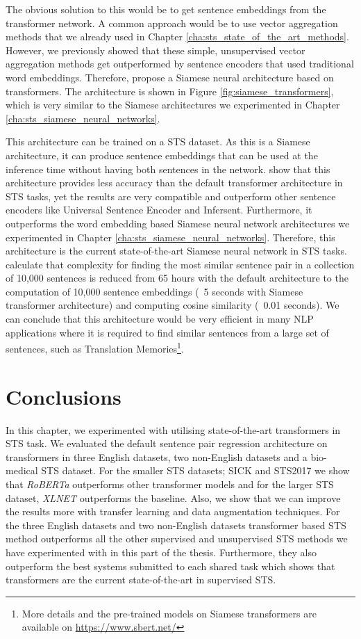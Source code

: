The obvious solution to this would be to get sentence embeddings from the transformer network. A common approach would be to use vector aggregation methods that we already used in Chapter \ref{cha:sts_state_of_the_art_methods}. However, we previously showed that these simple, unsupervised vector aggregation methods get outperformed by sentence encoders that used traditional word embeddings. Therefore, \autocite{reimers-gurevych-2019-sentence} propose a Siamese neural architecture based on transformers. The architecture is shown in Figure \ref{fig:siamese_transformers}, which is very similar to the Siamese architectures we experimented in Chapter \ref{cha:sts_siamese_neural_networks}.

This architecture can be trained on a STS dataset. As this is a Siamese architecture, it can produce sentence embeddings that can be used at the inference time without having both sentences in the network. \autocite{reimers-gurevych-2019-sentence} show that this architecture provides less accuracy than the default transformer architecture in STS tasks, yet the results are very compatible and outperform other sentence encoders like Universal Sentence Encoder and Infersent. Furthermore, it outperforms the word embedding based Siamese neural network architectures we experimented in Chapter \ref{cha:sts_siamese_neural_networks}. Therefore, this architecture is the current state-of-the-art Siamese neural network in STS tasks. \autocite{reimers-gurevych-2019-sentence} calculate that complexity for finding the most similar sentence pair in a collection of 10,000 sentences is reduced from 65 hours with the default architecture to the computation of 10,000 sentence embeddings (~5 seconds with Siamese transformer architecture) and computing cosine similarity (~0.01 seconds). We can conclude that this architecture would be very efficient in many NLP applications where it is required to find similar sentences from a large set of sentences, such as Translation Memories\footnote{More details and the pre-trained models on Siamese transformers are available on \url{https://www.sbert.net/}}. 


\section{Conclusions}
In this chapter, we experimented with utilising state-of-the-art transformers in STS task. We evaluated the default sentence pair regression architecture on transformers in three English datasets, two non-English datasets and a bio-medical STS dataset. For the smaller STS datasets; SICK and STS2017 we show that \textit{RoBERTa} outperforms other transformer models and for the larger STS dataset, \textit{XLNET} outperforms the baseline. Also, we show that we can improve the results more with transfer learning and data augmentation techniques. For the three English datasets and two non-English datasets transformer based STS method outperforms all the other supervised and unsupervised STS methods we have experimented with in this part of the thesis. Furthermore, they also outperform the best systems submitted to each shared task which shows that transformers are the current state-of-the-art in supervised STS.

